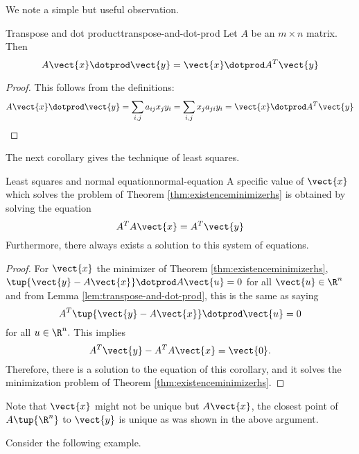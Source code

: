 We note a simple but useful observation.

\begin{lemma}{Transpose and dot product}{transpose-and-dot-prod}
Let $A$ be an $m\times n$ matrix. Then 
\begin{equation*}
A\vect{x} \dotprod \vect{y} = \vect{x}\dotprod A^T\vect{y} 
\end{equation*}
\end{lemma}

\begin{proof}
This follows from the definitions:
\[ A\vect{x} \dotprod \vect{y}=\sum_{i,j}a_{ij}x_{j} y_{i}
=\sum_{i,j}x_{j} a_{ji} y_{i}= \vect{x} \dotprod A^T\vect{y}
\] \end{proof}

The next corollary gives the technique of least squares.

\begin{corollary}{Least squares and normal equation}{normal-equation}
A specific value of $\vect{x}$ which solves the problem of Theorem 
\ref{thm:existenceminimizerhs} is obtained by solving the equation
\begin{equation*}
A^TA\vect{x}=A^T\vect{y}
\end{equation*}
Furthermore, there always exists a solution to this system of equations.
\end{corollary}

\begin{proof} 
For $\vect{x}$ the minimizer of Theorem \ref{thm:existenceminimizerhs}, $\tup{
\vect{y}-A\vect{x}} \dotprod A \vect{u} =0$ for all $\vect{u} \in \R^{n}$ and from
Lemma \ref{lem:transpose-and-dot-prod}, this is the same as saying
\begin{equation*}
A^T\tup{\vect{y}-A\vect{x}} \dotprod \vect{u}=0
\end{equation*}
for all $u \in \R^{n}.$ This implies 
\begin{equation*}
A^T\vect{y}-A^TA\vect{x}=\vect{0}.
\end{equation*}
Therefore, there is a solution to the equation of this corollary, and it
solves the minimization problem of Theorem \ref{thm:existenceminimizerhs}.
\end{proof}

Note that $\vect{x}$ might not be unique but $A\vect{x}$, the closest
point of $A\tup{\R^{n}}$ to $\vect{y}$ is unique as was shown in the
above argument. 

Consider the following example. 


